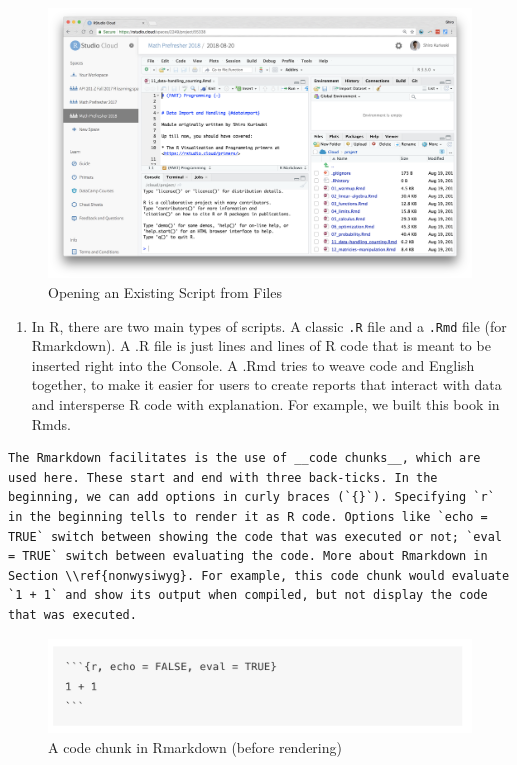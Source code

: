 \documentclass[]{book}
\providecommand{\tightlist}{%
  \setlength{\itemsep}{0pt}\setlength{\parskip}{0pt}}
\theoremstyle{definition}
\theoremstyle{definition}
\theoremstyle{definition}
\theoremstyle{remark}
\begin{document}
\begin{figure}
\centering
\includegraphics{images/11_3_rstudio-files.png}
\caption{Opening an Existing Script from Files}
\end{figure}

\begin{enumerate}
\def\labelenumi{\arabic{enumi}.}
\setcounter{enumi}{4}
\tightlist
\item
  In R, there are two main types of scripts. A classic \texttt{.R} file and a \texttt{.Rmd} file (for Rmarkdown). A .R file is just lines and lines of R code that is meant to be inserted right into the Console. A .Rmd tries to weave code and English together, to make it easier for users to create reports that interact with data and intersperse R code with explanation. For example, we built this book in Rmds.
\end{enumerate}

\begin{verbatim}
The Rmarkdown facilitates is the use of __code chunks__, which are used here. These start and end with three back-ticks. In the beginning, we can add options in curly braces (`{}`). Specifying `r` in the beginning tells to render it as R code. Options like `echo = TRUE` switch between showing the code that was executed or not; `eval = TRUE` switch between evaluating the code. More about Rmarkdown in Section \\ref{nonwysiwyg}. For example, this code chunk would evaluate `1 + 1` and show its output when compiled, but not display the code that was executed.
\end{verbatim}

\begin{figure}
\centering
\includegraphics{images/11_4_codechunk.png}
\caption{A code chunk in Rmarkdown (before rendering)}
\end{figure}
\end{document}
